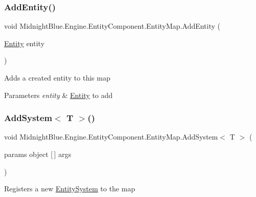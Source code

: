 \subsubsection{\texorpdfstring{Add\+Entity()}{AddEntity()}}
{\footnotesize\ttfamily void Midnight\+Blue.\+Engine.\+Entity\+Component.\+Entity\+Map.\+Add\+Entity (\begin{DoxyParamCaption}\item[{\hyperlink{class_midnight_blue_1_1_engine_1_1_entity_component_1_1_entity}{Entity}}]{entity }\end{DoxyParamCaption})\hspace{0.3cm}{\ttfamily [inline]}}



Adds a created entity to this map 


\begin{DoxyParams}{Parameters}
{\em entity} & \hyperlink{class_midnight_blue_1_1_engine_1_1_entity_component_1_1_entity}{Entity} to add\\
\hline
\end{DoxyParams}
\hypertarget{class_midnight_blue_1_1_engine_1_1_entity_component_1_1_entity_map_a066bbf30c7ca22fea39c31355a2d8c71}{}\label{class_midnight_blue_1_1_engine_1_1_entity_component_1_1_entity_map_a066bbf30c7ca22fea39c31355a2d8c71} 
\subsubsection{\texorpdfstring{Add\+System$<$ T $>$()}{AddSystem< T >()}}
{\footnotesize\ttfamily void Midnight\+Blue.\+Engine.\+Entity\+Component.\+Entity\+Map.\+Add\+System$<$ T $>$ (\begin{DoxyParamCaption}\item[{params object \mbox{[}$\,$\mbox{]}}]{args }\end{DoxyParamCaption})\hspace{0.3cm}{\ttfamily [inline]}}



Registers a new \hyperlink{class_midnight_blue_1_1_engine_1_1_entity_component_1_1_entity_system}{Entity\+System} to the map 


